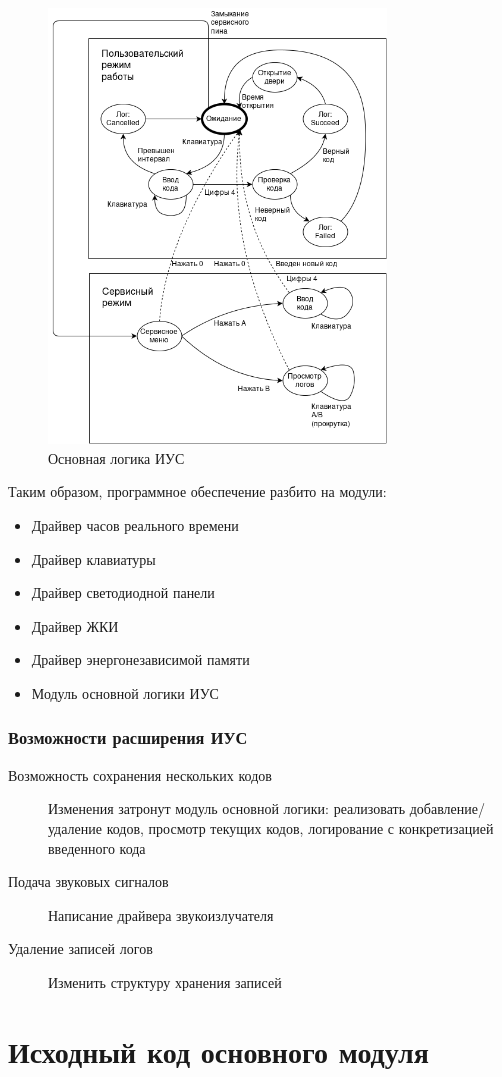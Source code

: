 \documentclass[12pt, a4paper] {article}
\begin{document}
\begin{figure}[h!]
  \centering
  \includegraphics[width=0.8\textwidth]{diag}
  \caption{Основная логика ИУС}
\end{figure}

Таким образом, программное обеспечение разбито на модули:
\begin{itemize}
  \item Драйвер часов реального времени
  \item Драйвер клавиатуры
  \item Драйвер светодиодной панели
  \item Драйвер ЖКИ
  \item Драйвер энергонезависимой памяти
  \item Модуль основной логики ИУС
\end{itemize}

\subsubsection*{Возможности расширения ИУС}
\begin{description}
\item[Возможность сохранения нескольких кодов] Изменения затронут модуль
  основной логики: реализовать добавление/удаление кодов, просмотр текущих
  кодов, логирование с конкретизацией введенного кода
\item[Подача звуковых сигналов] Написание драйвера звукоизлучателя
\item[Удаление записей логов] Изменить структуру хранения записей
  
\end{description}
\newpage

\section{Исходный код основного модуля}
\inputminted{c++}{main.c}
\end{document}

